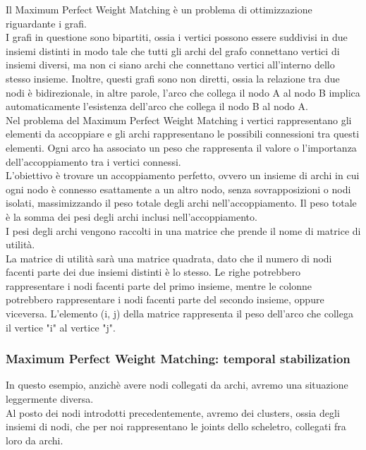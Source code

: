  Il Maximum Perfect Weight Matching è un problema di ottimizzazione riguardante i grafi. \\
 I grafi in questione sono bipartiti, ossia i vertici possono essere suddivisi in due insiemi distinti in
modo tale che tutti gli archi del grafo connettano vertici di insiemi diversi, ma non ci siano archi che connettano vertici all’interno dello stesso insieme.
Inoltre, questi grafi sono non diretti, ossia la relazione tra due nodi è bidirezionale, in altre parole, l'arco che collega il nodo A al nodo B implica automaticamente l'esistenza dell'arco che collega il nodo B al nodo A. \\
Nel problema del Maximum Perfect Weight Matching i vertici rappresentano gli elementi da accoppiare e gli archi rappresentano le possibili connessioni tra questi elementi. Ogni arco ha associato un peso che rappresenta il valore o l'importanza dell'accoppiamento tra i vertici connessi. \\
 L'obiettivo è trovare un accoppiamento perfetto, ovvero un insieme di archi in cui ogni nodo è connesso esattamente a un altro nodo, senza sovrapposizioni o nodi isolati, massimizzando il peso totale degli archi nell'accoppiamento.
 Il peso totale è la somma dei pesi degli archi inclusi nell'accoppiamento. \\
 I pesi degli archi vengono raccolti in una matrice che prende il nome di matrice di utilità. \\
 La matrice di utilità sarà una matrice quadrata, dato che il numero di nodi facenti parte dei due insiemi distinti è lo stesso.
Le righe potrebbero rappresentare i nodi facenti parte del primo insieme, mentre le colonne potrebbero rappresentare i nodi facenti parte del secondo insieme, oppure viceversa.
 L'elemento (i, j) della matrice rappresenta il peso dell'arco che collega il vertice "i" al vertice "j".
 


\subsubsection{Maximum Perfect Weight Matching: temporal stabilization}
In questo esempio, anzichè avere nodi collegati da archi, avremo una situazione leggermente diversa. \\   
Al posto dei nodi introdotti precedentemente, avremo dei clusters, ossia degli insiemi di nodi, che per noi rappresentano le joints dello scheletro, collegati fra loro da archi.
\\  


